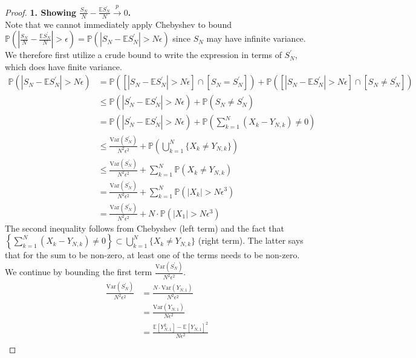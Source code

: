 \documentclass[12pt]{article}
\newcommand*{\abs}[1]{\left\lvert#1\right\rvert}
\newcommand{\E}{\mathbb{E}}
\newcommand{\Var}{\mathrm{Var}}
\newcommand{\Prob}{\mathbb{P}}
\begin{document}
\begin{proof}
 \bigskip
 \noindent
 \textbf{1. Showing $\frac{S_N}{N} - \frac{\E S_N^\prime}{N} \overset{p}{\to} 0$.} \\
 Note that we cannot immediately apply Chebyshev to bound $\Prob\left(\abs{\frac{S_N}{N} - \frac{\E S_N^\prime}{N}} > \epsilon\right) = \Prob\left(\abs{S_N - \E S_N^\prime} > N\epsilon\right)$ since 
 $S_N$ may have infinite variance. We therefore first utilize a crude bound to write the expression in terms of $S_N^\prime$, which does have finite variance. 
 \begin{align*}
 \Prob\left(\abs{S_N - \E S_N^\prime} > N\epsilon\right) &= \Prob\left(\left[\abs{S_N - \E S_N^\prime} > N\epsilon\right] \cap \left[S_N = S_N^\prime\right] \right) +  \Prob\left(\left[\abs{S_N - \E S_N^\prime} > N\epsilon\right] \cap \left[S_N \neq S_N^\prime\right] \right) \\
 										    &\leq \Prob\left(\abs{S^\prime_N - \E S_N^\prime} > N\epsilon \right) + \Prob(S_N \neq S_N^\prime) \\
										    &= \Prob\left(\abs{S^\prime_N - \E S_N^\prime} > N\epsilon \right) + \Prob\left(\sum_{k = 1}^{N} (X_k - Y_{N,k}) \neq 0\right) \\
										    &\leq \frac{\Var(S_N^\prime)}{N^2 \epsilon^2} + \Prob\left(\bigcup_{k = 1}^{N} \{X_k \neq Y_{N,k}\} \right) \\
										    &\leq \frac{\Var(S_N^\prime)}{N^2 \epsilon^2} + \sum_{k = 1}^{N} \Prob(X_k \neq Y_{N,k}) \\
										    &= \frac{\Var(S_N^\prime)}{N^2 \epsilon^2} + \sum_{k = 1}^{N} \Prob(\abs{X_k} > N\epsilon^3) \\
										    &= \frac{\Var(S_N^\prime)}{N^2 \epsilon^2} + N \cdot \Prob(\abs{X_1} > N\epsilon^3)
 \end{align*}
 The second inequality follows from Chebyshev (left term) and the fact that $\left\{\sum_{k = 1}^{N} (X_k - Y_{N,k}) \neq 0\right\} \subset \bigcup_{k = 1}^{N} \{X_k \neq Y_{N,k}\}$ (right term). The latter says that for the sum to 
 be non-zero, at least one of the terms needs to be non-zero. We continue by bounding the first term $\frac{\Var(S_N^\prime)}{N^2 \epsilon^2}$. 
 \begin{align*}
 \frac{\Var(S_N^\prime)}{N^2 \epsilon^2} &= \frac{N \cdot \Var(Y_{N,1})}{N^2 \epsilon^2} \\
 							      &=  \frac{\Var(Y_{N,1})}{N \epsilon^2} \\
							      &= \frac{\E[Y_{N,1}^2] - \E[Y_{N,1}]^2}{N\epsilon^2} \\

\end{align*}
\end{proof}
\end{document}
